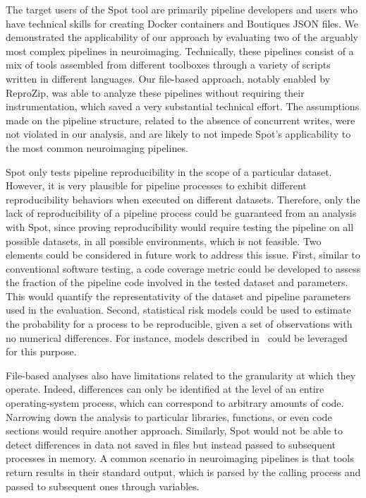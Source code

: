 \documentclass[a4paper,num-refs]{oup-contemporary}
\newcommand{\revised}[1]{\color{blue}#1\color{black}\xspace}
\newcommand{\reprozip}[0]{ReproZip\xspace}
\newcommand{\toolname}[0]{Spot\xspace}
\begin{document}
\revised{The target users of the \toolname tool are primarily pipeline developers and users who have 
technical skills for creating Docker containers and Boutiques JSON files.}
We demonstrated the applicability of our approach by evaluating two of the
arguably most complex pipelines in neuroimaging. Technically, these
pipelines consist of a mix of tools assembled from different toolboxes
through a variety of scripts written in different languages. Our file-based
approach, notably enabled by \reprozip, was able to analyze these pipelines
without requiring their instrumentation, which saved a very substantial
technical effort. The assumptions made on the pipeline structure, related
to the absence of concurrent writes, were not violated in our analysis, and
are likely to not impede \toolname's applicability to the most common
neuroimaging pipelines.

\revised{
\toolname only tests pipeline reproducibility in the scope of a particular dataset. However, it is very plausible 
for pipeline processes to exhibit different reproducibility behaviors when executed on different datasets. 
Therefore, only the lack of reproducibility of a pipeline process could be guaranteed from an analysis with \toolname, 
since proving reproducibility would require testing the pipeline on all possible datasets, in all possible environments, 
which is not feasible. Two elements could be considered in future work to address this issue. 
First, similar to conventional software testing, a code coverage metric could be developed to assess 
the fraction of the pipeline code involved in the tested dataset and parameters. This would quantify 
the representativity of the dataset and pipeline parameters used in the evaluation. Second, statistical 
risk models could be used to estimate the probability for a process to be reproducible, given a set of 
observations with no numerical differences. For instance, models described in~\cite{beauzamy2004methodes} 
could be leveraged for this purpose.}

File-based analyses also have limitations related to the
granularity at which they operate. Indeed, differences can only be
identified at the level of an entire operating-system process, which can
correspond to arbitrary amounts of code. Narrowing down the analysis to
particular libraries, functions, or even code sections would require
another approach. Similarly, \toolname would not be able to detect
differences in data not saved in files but instead passed to subsequent processes
in memory. A common scenario in neuroimaging pipelines is that tools return
results in their standard output, which is parsed by the calling process
and passed to subsequent ones through variables.
\end{document}
